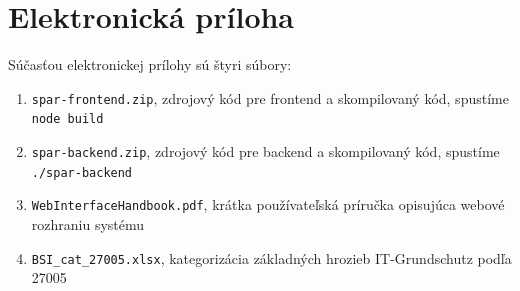 \chapter{Elektronická príloha}\label{chap:appendix}

Súčasťou elektronickej prílohy sú štyri súbory:
\begin{enumerate}[nosep,label=\alph*)]
    \item \lstinline|spar-frontend.zip|, zdrojový kód pre frontend a skompilovaný kód, spustíme \lstinline|node build|
    \item \lstinline|spar-backend.zip|, zdrojový kód pre backend a skompilovaný kód, spustíme \lstinline|./spar-backend|
    \item \lstinline|WebInterfaceHandbook.pdf|, krátka používateľská príručka opisujúca webové rozhraniu systému
    \item \lstinline|BSI_cat_27005.xlsx|, kategorizácia základných hrozieb IT-Grundschutz podľa 27005
\end{enumerate}